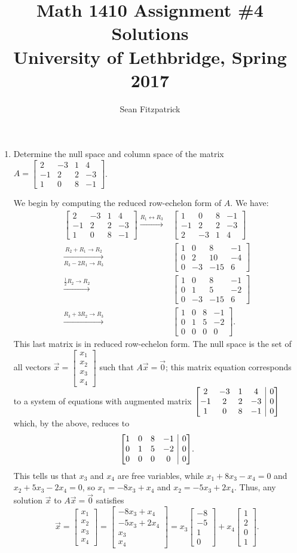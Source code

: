 \documentclass[letterpaper,12pt]{article}
\title{Math 1410 Assignment \#4 Solutions\\University of Lethbridge, Spring 2017}
\author{Sean Fitzpatrick}
\makeatletter
\newcommand{\bbm}{\begin{bmatrix}}
\newcommand{\ebm}{\end{bmatrix}}
\newenvironment{amatrix}[1]{%
  \left[\begin{array}{@{}*{#1}{c}|c@{}}
}{%
  \end{array}\right]
}
\newcommand{\bam}{\begin{amatrix}}
\newcommand{\eam}{\end{amatrix}}
\makeatother
\begin{document}
 \maketitle


\begin{enumerate}
\item Determine the null space and column space of the matrix $A = \bbm 2&-3&1&4\\-1&2&2&-3\\1&0&8&-1\ebm$.

\bigskip

We begin by computing the reduced row-echelon form of $A$. We have:
\begin{align*}
 \bbm 2&-3&1&4\\-1&2&2&-3\\1&0&8&-1\ebm\xrightarrow{R_1\leftrightarrow R_3} & \bbm 1&0&8&-1\\-1&2&2&-3\\2&-3&1&4\ebm\\
\xrightarrow[R_3-2R_1\to R_3]{R_2+R_1\to R_2} & \bbm 1&0&8&-1\\0&2&10&-4\\0&-3&-15&6\ebm\\
\xrightarrow{\frac{1}{2}R_2\to R_2} & \bbm 1&0&8&-1\\0&1&5&-2\\0&-3&-15&6\ebm\\
\xrightarrow{R_3+3R_2\to R_3} & \bbm 1&0&8&-1\\0&1&5&-2\\0&0&0&0\ebm.
\end{align*}
This last matrix is in reduced row-echelon form. The null space is the set of all vectors $\vec{x}=\bbm x_1\\x_2\\x_3\\x_4\ebm$ such that $A\vec{x}=\vec{0}$; this matrix equation corresponds to a system of equations with augmented matrix $\bam{4} 2&-3&1&4&0\\-1&2&2&-3&0\\1&0&8&-1&0\eam$ which, by the above, reduces to
\[
 \bam{4} 1&0&8&-1&0\\0&1&5&-2&0\\0&0&0&0&0\eam.
\]
This tells us that $x_3$ and $x_4$ are free variables, while $x_1+8x_3-x_4=0$ and $x_2+5x_3-2x_4=0$, so $x_1=-8x_3+x_4$ and $x_2=-5x_3+2x_4$. Thus, any solution $\vec{x}$ to $A\vec{x}=\vec{0}$ satisfies
\[
 \vec{x}=\bbm x_1\\x_2\\x_3\\x_4\ebm = \bbm -8x_3+x_4\\-5x_3+2x_4\\x_3\\x_4\ebm = x_3\bbm -8\\-5\\1\\0\ebm + x_4\bbm 1\\2\\0\\1\ebm.
\]
\end{enumerate}
\end{document}
